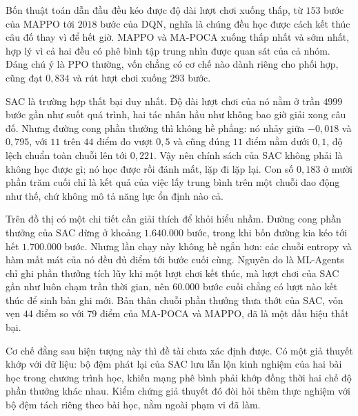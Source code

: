 \indent Bốn thuật toán dẫn đầu đều kéo được độ dài lượt chơi xuống thấp, từ $153$ bước của
MAPPO tới $2018$ bước của DQN, nghĩa là chúng đều học được cách kết thúc câu đố thay vì để hết
giờ. MAPPO và MA-POCA xuống thấp nhất và sớm
nhất, hợp lý vì cả hai đều có phê bình tập trung nhìn được quan sát của cả nhóm. Đáng chú
ý là PPO thường, vốn chẳng có cơ chế nào dành riêng cho phối hợp, cũng đạt $0{,}834$ và
rút lượt chơi xuống $293$ bước.

\indent SAC là trường hợp thất bại duy nhất. Độ
dài lượt chơi của nó nằm ở trần $4999$ bước gần như suốt
quá trình, hai tác nhân hầu như không bao giờ giải xong câu đố. Nhưng đường cong phần
thưởng thì không hề phẳng: nó nhảy giữa $-0{,}018$ và $0{,}795$, với $11$ trên $44$ điểm đo
vượt $0{,}5$ và cũng đúng $11$ điểm nằm dưới $0{,}1$, độ lệch
chuẩn toàn chuỗi lên tới $0{,}221$. Vậy nên chính sách của SAC không phải là không học
được gì; nó học được rồi đánh mất, lặp đi lặp lại. Con số $0{,}183$ ở mười phần trăm cuối
chỉ là kết quả của việc lấy trung bình trên một chuỗi dao động như thế, chứ không mô tả
năng lực ổn định nào cả.

\indent Trên đồ thị có một chi tiết cần giải thích để khỏi hiểu nhầm. Đường cong phần
thưởng của SAC dừng ở khoảng $1.640.000$ bước, trong khi bốn đường kia kéo tới hết $1.700.000$
bước. Nhưng lần chạy này không hề ngắn hơn: các
chuỗi entropy và hàm mất mát của nó đều đủ điểm tới bước cuối cùng. Nguyên do là ML-Agents
chỉ ghi phần thưởng tích lũy khi một lượt chơi kết thúc, mà lượt chơi của SAC gần như luôn
chạm trần thời gian, nên $60.000$ bước cuối chẳng có lượt nào kết thúc để sinh bản
ghi mới. Bản thân chuỗi phần thưởng thưa thớt của SAC, vỏn vẹn $44$ điểm so với $79$ điểm của
MA-POCA và MAPPO, đã là một dấu hiệu thất bại.

\indent Cơ chế đằng sau hiện tượng này thì đề tài chưa xác định được. Có một giả thuyết
khớp với dữ liệu: bộ đệm phát lại của SAC lưu lẫn lộn kinh nghiệm của hai bài học trong
chương trình học, khiến mạng phê bình phải khớp đồng thời hai chế độ phần thưởng khác
nhau. Kiểm chứng giả thuyết đó đòi hỏi thêm thực nghiệm với bộ đệm tách riêng theo bài
học, nằm ngoài phạm vi đã làm.

